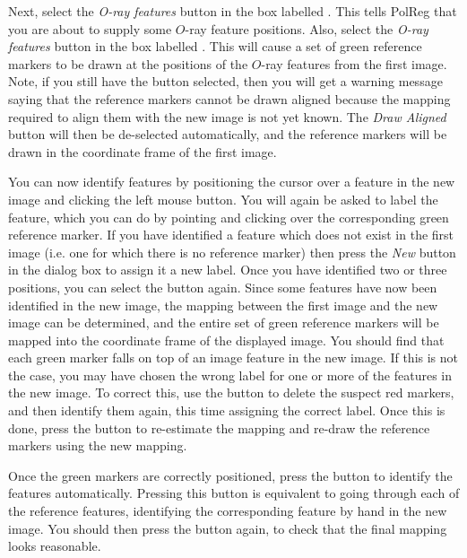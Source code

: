 Next, select the {\em O-ray features} button in the box labelled
. This tells PolReg that you are
about to supply some $O$-ray feature positions. Also, select the 
{\em O-ray features} button in the box labelled
. This will cause
a set of green reference markers to be drawn at the positions of the
$O$-ray features from the first image. Note, if you still have the
 button selected, then
you will get a warning message saying that the reference markers cannot
be drawn aligned because the mapping required to align them with the new
image is not yet known. The {\em Draw Aligned} button will then be
de-selected automatically, and the reference markers will be drawn in the
coordinate frame of the first image.

You can now identify features by positioning the cursor over a feature in
the new image and clicking the left mouse button. You will again be asked
to label the feature, which you can do by pointing and clicking over the
corresponding green reference marker. If you have identified a feature
which does not exist in the first image (i.e. one for which there is no
reference marker) then press the {\em New} button in the  dialog box to assign it a new
label. Once you have identified two or three positions, you can select
the  button again. Since
some features have now been identified in the new image, the mapping
between the first image and the new image can be determined, and the
entire set of green reference markers will be mapped into the coordinate
frame of the displayed image. You should find that each green marker
falls on top of an image feature in the new image. If this is not the
case, you may have chosen the wrong label for one or more of the 
features in the new image. To correct this, use the  button to delete the suspect red markers, and
then identify them again, this time assigning the correct label. Once
this is done, press the  button to
re-estimate the mapping and re-draw the reference markers using the new
mapping.

Once the green markers are correctly positioned, press the
 button to identify the features
automatically. Pressing this button is equivalent to going
through each of the reference features, identifying the corresponding
feature by hand in the new image. You should then press the  button again, to check that the final mapping
looks reasonable.

